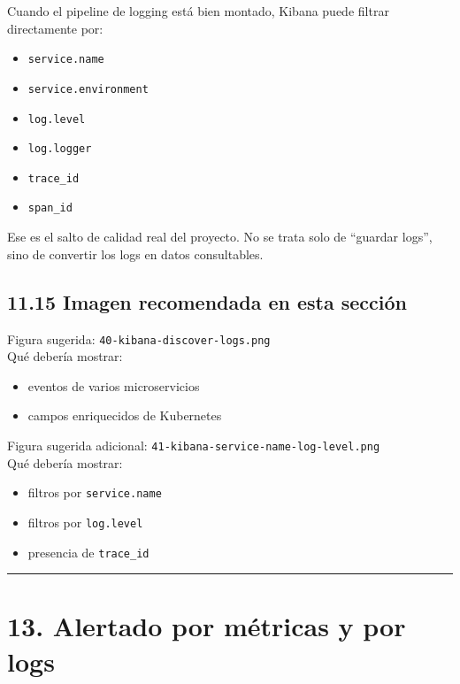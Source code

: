 \documentclass[
a4paper,
12pt]{report}
\providecommand{\tightlist}{%
  \setlength{\itemsep}{0pt}\setlength{\parskip}{0pt}}
\begin{document}
Cuando el pipeline de logging está bien montado, Kibana puede filtrar
directamente por:

\begin{itemize}
\tightlist
\item
  \texttt{service.name}
\item
  \texttt{service.environment}
\item
  \texttt{log.level}
\item
  \texttt{log.logger}
\item
  \texttt{trace\_id}
\item
  \texttt{span\_id}
\end{itemize}

Ese es el salto de calidad real del proyecto. No se trata solo de
``guardar logs'', sino de convertir los logs en datos consultables.

\section{11.15 Imagen recomendada en esta
sección}\label{imagen-recomendada-en-esta-secciuxf3n-5}

Figura sugerida: \texttt{40-kibana-discover-logs.png}\\
Qué debería mostrar:

\begin{itemize}
\tightlist
\item
  eventos de varios microservicios
\item
  campos enriquecidos de Kubernetes
\end{itemize}

Figura sugerida adicional:
\texttt{41-kibana-service-name-log-level.png}\\
Qué debería mostrar:

\begin{itemize}
\tightlist
\item
  filtros por \texttt{service.name}
\item
  filtros por \texttt{log.level}
\item
  presencia de \texttt{trace\_id}
\end{itemize}

\begin{center}\rule{0.5\linewidth}{0.5pt}\end{center}

\chapter{13. Alertado por métricas y por
logs}\label{alertado-por-muxe9tricas-y-por-logs}
\end{document}
